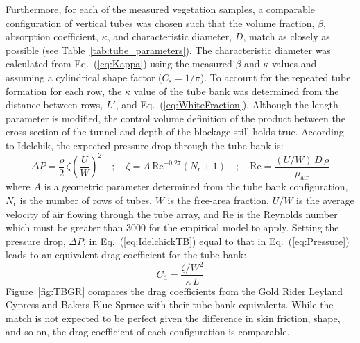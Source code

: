 \documentclass[12pt]{article}
\begin{document}
Furthermore, for each of the measured vegetation samples, a comparable configuration of vertical tubes was chosen such that the volume fraction, $\beta$, absorption coefficient, $\kappa$, and characteristic diameter, $D$, match as closely as possible (see Table~\ref{tab:tube_parameters}). The characteristic diameter was calculated from Eq.~(\ref{eq:Kappa}) using the measured $\beta$ and $\kappa$ values and assuming a cylindrical shape factor ($C_{\mathrm{s}} = 1/\pi$). To account for the repeated tube formation for each row, the $\kappa$ value of the tube bank was determined from the distance between rows, $L'$, and Eq.~(\ref{eq:WhiteFraction}). Although the length parameter is modified, the control volume definition of the product between the cross-section of the tunnel and depth of the blockage still holds true. According to Idelchik, the expected pressure drop through the tube bank is:
\begin{equation}
\label{eq:IdelchickTB}
\Delta P = \frac{\rho}{2}\, \zeta  \left( \frac{U}{W} \right)^2  \quad ; \quad \zeta = A \, \mathrm{Re}^{-0.27} (N_\mathrm{r}+1) \quad ; \quad  \mathrm{Re} = \frac{(U/W) \, D \, \rho}{\mu_\mathrm{air}}
\end{equation}
where $A$ is a geometric parameter determined from the tube bank configuration, $N_\mathrm{r}$ is the number of rows of tubes, $W$ is the free-area fraction, $U/W$ is the average velocity of air flowing through the tube array, and Re is the Reynolds number which must be greater than 3000 for the empirical model to apply. Setting the pressure drop, $\Delta P$, in Eq.~(\ref{eq:IdelchickTB}) equal to that in Eq.~(\ref{eq:Pressure}) leads to an equivalent drag coefficient for the tube bank:
\begin{equation}
   C_\mathrm{d} = \frac{\zeta/W^2}{\kappa \, L}
\end{equation}
Figure~\ref{fig:TBGR} compares the drag coefficients from the Gold Rider Leyland Cypress and Bakers Blue Spruce with their tube bank equivalents. While the match is not expected to be perfect given the difference in skin friction, shape, and so on, the drag coefficient of each configuration is comparable.
\end{document}

